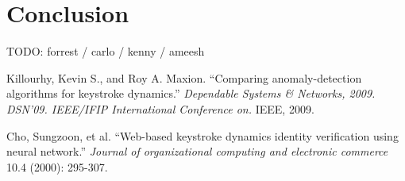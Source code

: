 \documentclass{article}
\begin{document}
\section{Conclusion}
TODO: forrest / carlo / kenny / ameesh


\begin{thebibliography}{99}
   Killourhy, Kevin S., and Roy A. Maxion. 
   ``Comparing anomaly-detection algorithms for keystroke dynamics.''
   \textit{Dependable Systems \& Networks, 2009. DSN'09. IEEE/IFIP International Conference on.}
   IEEE, 2009. 
 
   Cho, Sungzoon, et al.
   ``Web-based keystroke dynamics identity verification using neural network.'' 
   \textit{Journal of organizational computing and electronic commerce}
   10.4 (2000): 295-307.
  
\end{thebibliography}
\end{document}
